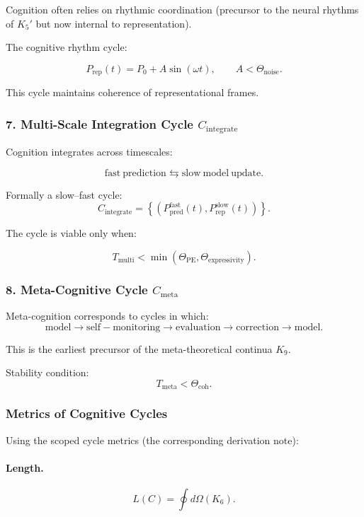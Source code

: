 Cognition often relies on rhythmic coordination (precursor to the
neural rhythms of $K_5'$ but now internal to representation).

The cognitive rhythm cycle:

\[
 P_{\mathrm{rep}}(t) = P_0 + A\sin(\omega t),\qquad
 A < \Theta_{\mathrm{noise}}.
\]

This cycle maintains coherence of representational frames.

\subsubsection{7. Multi-Scale Integration Cycle $C_{\mathrm{integrate}}$}

Cognition integrates across timescales:

\[
 \mathrm{fast\ prediction}
 \leftrightarrows
 \mathrm{slow\ model\ update}.
\]

Formally a slow–fast cycle:
\[
 C_{\mathrm{integrate}} =
 \left\{
   (P_{\mathrm{pred}}^{\mathrm{fast}}(t),
    P_{\mathrm{rep}}^{\mathrm{slow}}(t))
 \right\}.
\]

The cycle is viable only when:

\[
 T_{\mathrm{multi}} < \min(\Theta_{\mathrm{PE}},\Theta_{\mathrm{expressivity}}).
\]

\subsubsection{8. Meta-Cognitive Cycle $C_{\mathrm{meta}}$}

Meta-cognition corresponds to cycles in which:
\[
 \mathrm{model}
 \to 
 \mathrm{self-monitoring}
 \to
 \mathrm{evaluation}
 \to
 \mathrm{correction}
 \to
 \mathrm{model}.
\]

This is the earliest precursor of the meta-theoretical continua $K_9$.

Stability condition:
\[
 T_{\mathrm{meta}} < \Theta_{\mathrm{coh}}.
\]

\subsubsection{Metrics of Cognitive Cycles}

Using the scoped cycle metrics (the corresponding derivation note):

\paragraph{Length.}
\[
  L(C)=\oint d\Omega(K_6).
\]

